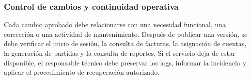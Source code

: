 \subsubsection{Control de cambios y continuidad operativa}
Cada cambio aprobado debe relacionarse con una necesidad funcional, una corrección o una actividad de mantenimiento. Después de publicar una versión, se debe verificar el inicio de sesión, la consulta de facturas, la asignación de cuentas, la generación de partidas y la consulta de reportes. Si el servicio deja de estar disponible, el responsable técnico debe preservar los logs, informar la incidencia y aplicar el procedimiento de recuperación autorizado.
